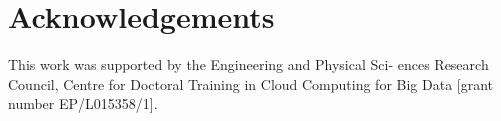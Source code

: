 \documentclass{article}
\begin{document}
\section{Acknowledgements}

This work was supported by the Engineering and Physical Sci- ences Research Council, Centre for Doctoral Training in Cloud Computing for Big Data [grant number EP/L015358/1].






\end{document}
